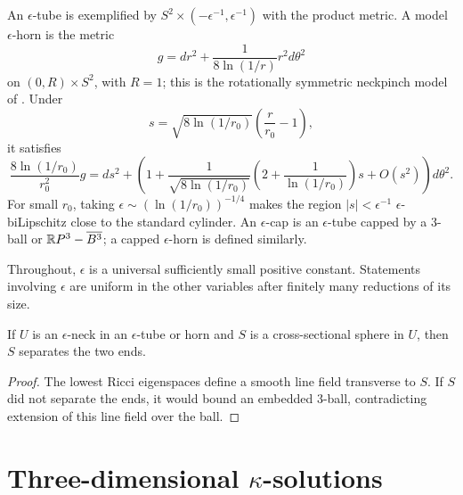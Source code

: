 An $\epsilon$-tube is exemplified by
$S^2\times(-\epsilon^{-1},\epsilon^{-1})$ with the product metric. A model
$\epsilon$-horn is the metric
\begin{equation}
g=dr^2+\frac{1}{8\ln(1/r)}r^2d\theta^2
\end{equation}
on $(0,R)\times S^2$, with $R=1$; this is the rotationally symmetric
neckpinch model of \cite{Angenent-Knopf}. Under
\[
s=\sqrt{8\ln(1/r_0)}\left(\frac r{r_0}-1\right),
\]
it satisfies
\begin{equation}
\frac{8\ln(1/r_0)}{r_0^2}g
=ds^2+\left(1+\frac{1}{\sqrt{8\ln(1/r_0)}}
\left(2+\frac{1}{\ln(1/r_0)}\right)s+O(s^2)\right)d\theta^2.
\end{equation}
For small $r_0$, taking
$\epsilon\sim(\ln(1/r_0))^{-1/4}$ makes the region
$|s|<\epsilon^{-1}$ $\epsilon$-biLipschitz close to the standard cylinder.
An $\epsilon$-cap is an $\epsilon$-tube capped by a $3$-ball or
${\mathbb R} P^3-\overline{B^3}$; a capped $\epsilon$-horn is defined similarly.

\begin{remark}
  \label{rem:kl-notation-terminology-positivity-notation-terminology}

\label{remepsilon}
Throughout, $\epsilon$ is a universal sufficiently small positive constant.
Statements involving $\epsilon$ are uniform in the other variables after
finitely many reductions of its size.
\end{remark}

\begin{lemma}
  \label{lem:kl-notation-terminology-neck-geometry-lemma}

If $U$ is an $\epsilon$-neck in an $\epsilon$-tube or horn and $S$ is a
cross-sectional sphere in $U$, then $S$ separates the two ends.
\end{lemma}
\begin{proof}
\sketch The lowest Ricci eigenspaces define a smooth line field transverse to
$S$. If $S$ did not separate the ends, it would bound an embedded $3$-ball,
contradicting extension of this line field over the ball.
\end{proof}

\section{Three-dimensional $\kappa$-solutions}
 \label{II.1}

